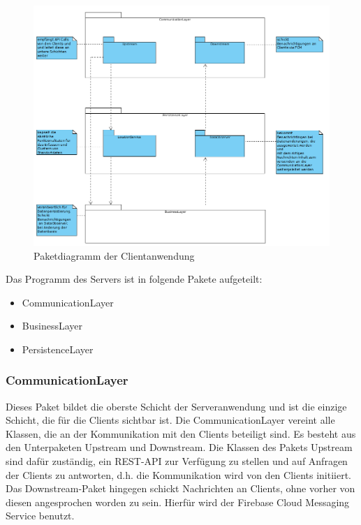 \documentclass[11pt,a4paper]{article}
\begin{document}
\begin{figure}[H]
	\centering
	\includegraphics[scale=0.5]{../Klassendiagramme/paketdiagramm_server.png}
	\caption{Paketdiagramm der Clientanwendung}
\end{figure}

Das Programm des Servers ist in folgende Pakete aufgeteilt:
\begin{itemize}
	\item CommunicationLayer
	\item BusinessLayer
	\item PersistenceLayer
\end{itemize}

\subsubsection{CommunicationLayer}
Dieses Paket bildet die oberste Schicht der Serveranwendung und ist die einzige Schicht, die für die Clients sichtbar ist. Die CommunicationLayer vereint alle Klassen, die an der Kommunikation mit den Clients beteiligt sind. Es besteht aus den Unterpaketen Upstream und Downstream. Die Klassen des Pakets Upstream sind dafür zuständig, ein REST-API zur Verfügung zu stellen und auf Anfragen der Clients zu antworten, d.h. die Kommunikation wird von den Clients initiiert. Das Downstream-Paket hingegen schickt Nachrichten an Clients, ohne vorher von diesen angesprochen worden zu sein. Hierfür wird der Firebase Cloud Messaging Service benutzt.\\
\end{document}
